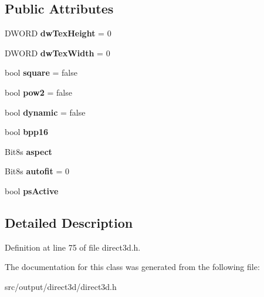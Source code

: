 \subsection*{Public Attributes}
\begin{DoxyCompactItemize}
\item 
\hypertarget{classCDirect3D_a9cc53e0233f977505e05ee041f0caa78}{D\-W\-O\-R\-D {\bfseries dw\-Tex\-Height} = 0}\label{classCDirect3D_a9cc53e0233f977505e05ee041f0caa78}

\item 
\hypertarget{classCDirect3D_a496f302fa81d3b230c5f78be2535ffb2}{D\-W\-O\-R\-D {\bfseries dw\-Tex\-Width} = 0}\label{classCDirect3D_a496f302fa81d3b230c5f78be2535ffb2}

\item 
\hypertarget{classCDirect3D_a761f1a50d5d3c161632325c76ad10ea9}{bool {\bfseries square} = false}\label{classCDirect3D_a761f1a50d5d3c161632325c76ad10ea9}

\item 
\hypertarget{classCDirect3D_a78a14a9db1e8e6a30586bc0e069ecbaf}{bool {\bfseries pow2} = false}\label{classCDirect3D_a78a14a9db1e8e6a30586bc0e069ecbaf}

\item 
\hypertarget{classCDirect3D_a49900dc75b6079841da7ef707397af35}{bool {\bfseries dynamic} = false}\label{classCDirect3D_a49900dc75b6079841da7ef707397af35}

\item 
\hypertarget{classCDirect3D_aa9f4499c1c73595ff5faa5472cb247cd}{bool {\bfseries bpp16}}\label{classCDirect3D_aa9f4499c1c73595ff5faa5472cb247cd}

\item 
\hypertarget{classCDirect3D_a667ec11060e1b35a393aed95c134b1c8}{Bit8s {\bfseries aspect}}\label{classCDirect3D_a667ec11060e1b35a393aed95c134b1c8}

\item 
\hypertarget{classCDirect3D_a181bdf0499756c0ca5a300a34477bbe0}{Bit8s {\bfseries autofit} = 0}\label{classCDirect3D_a181bdf0499756c0ca5a300a34477bbe0}

\item 
\hypertarget{classCDirect3D_af269336b17645f85062a82c545cd460a}{bool {\bfseries ps\-Active}}\label{classCDirect3D_af269336b17645f85062a82c545cd460a}

\end{DoxyCompactItemize}


\subsection{Detailed Description}


Definition at line 75 of file direct3d.\-h.



The documentation for this class was generated from the following file\-:\begin{DoxyCompactItemize}
\item 
src/output/direct3d/direct3d.\-h\end{DoxyCompactItemize}

